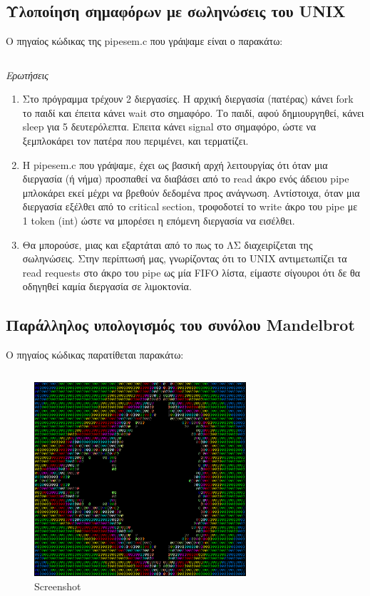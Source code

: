 \documentclass[a4paper,10pt]{article} \usepackage{anysize}
\begin{document}


\section*{} \setcounter{section}{1}
\subsection{Υλοποίηση σημαφόρων με σωληνώσεις του UNIX} 
Ο πηγαίος κώδικας της pipesem.c που γράψαμε είναι ο παρακάτω:
\inputminted[linenos,fontsize=\footnotesize,frame=leftline]{c}{files/pipesem.c}

\newpage
\emph{Ερωτήσεις}
\begin{enumerate}
	\item Στο πρόγραμμα τρέχουν 2 διεργασίες. Η αρχική διεργασία (πατέρας)
		κάνει fork το παιδί και έπειτα κάνει wait στο σημαφόρο.  Το παιδί,
		αφού δημιουργηθεί, κάνει sleep για 5 δευτερόλεπτα. Επειτα κάνει signal
		στο σημαφόρο, ώστε να ξεμπλοκάρει τον πατέρα που περιμένει, και
		τερματίζει.
	\item H pipesem.c που γράψαμε, έχει ως βασική αρχή λειτουργίας ότι όταν
		μια διεργασία (ή νήμα) προσπαθεί να διαβάσει από το read άκρο ενός
		άδειου pipe μπλοκάρει εκεί μέχρι να βρεθούν δεδομένα προς ανάγνωση.
		Αντίστοιχα, όταν μια διεργασία εξέλθει από το critical section,
		τροφοδοτεί το write άκρο του pipe με 1 token (int) ώστε να μπορέσει η
		επόμενη διεργασία να εισέλθει.
	\item Θα μπορούσε, μιας και εξαρτάται από το πως το ΛΣ διαχειρίζεται της
		σωληνώσεις. Στην περίπτωσή μας, γνωρίζοντας ότι το UNIX αντιμετωπίζει
		τα read requests στο άκρο του pipe ως μία FIFO λίστα, είμαστε σίγουροι
		ότι δε θα οδηγηθεί καμία διεργασία σε λιμοκτονία.\\
\end{enumerate}


\subsection{Παράλληλος υπολογισμός του συνόλου Mandelbrot} 
Ο πηγαίος κώδικας παρατίθεται παρακάτω:
\inputminted[linenos,fontsize=\footnotesize,frame=leftline]{c}{files/mandel.c}

\begin{figure}[H]
	\centering
	\includegraphics[width=0.7\textwidth]{files/mandel.png}
	\caption{Screenshot}
\end{figure}
\end{document}
